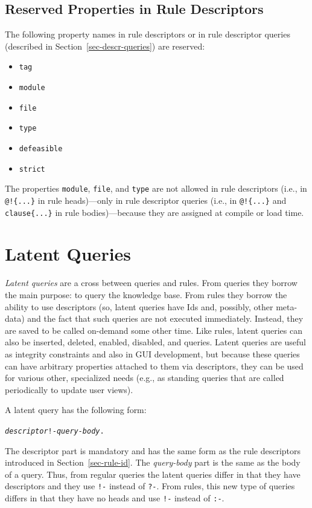 \documentclass[11pt]{article}
\begin{document}
\subsection{Reserved Properties in Rule Descriptors}

The following property names in rule descriptors or in rule descriptor
queries (described in Section~\ref{sec-descr-queries}) are reserved:
\begin{itemize}
\item  \texttt{tag}
\item  \texttt{module}
\item  \texttt{file}
\item  \texttt{type}
\item \texttt{defeasible}
\item \texttt{strict}  
\end{itemize}
The properties \texttt{module}, \texttt{file}, and \texttt{type}  are not allowed in rule
descriptors (i.e., in \texttt{@!\{...\}} in rule heads)---only in rule descriptor queries (i.e.,
in \texttt{@!\{...\}} and \texttt{clause\{...\}} in rule bodies)---because they are assigned
at compile or load time.  


\section{Latent Queries}
\label{sec-latent-query}

\emph{Latent queries} are a cross between queries and rules. From queries  
they borrow the main purpose: to query the knowledge base. From rules
they borrow the ability to use descriptors (so, latent queries have Ids and,
possibly, other meta-data) and the fact that such queries are not
executed immediately. Instead, they are saved to be called on-demand some
other time. Like rules, latent queries can also be inserted, deleted,
enabled, disabled, and queries.
Latent queries are useful as integrity constraints and also in GUI
development, but because these queries can have arbitrary properties
attached to them via descriptors, they can be used for various other,
specialized needs (e.g., as standing queries that are called periodically
to update user views).

A latent query has the following form:
\begin{alltt}
   \textnormal{\em descriptor}  !- \textnormal{\emph{query-body}}.
\end{alltt}
The descriptor part is mandatory and has the same form as the rule descriptors
introduced in Section~\ref{sec-rule-id}.
The \emph{query-body} part is the same as the body of a query. Thus, from
regular queries the latent queries differ in that they have descriptors and
they use \texttt{!-} instead of \texttt{?-}. From rules, this new type of
queries differs in that they have no heads and use \texttt{!-} instead of
\texttt{:-}.
\end{document}

